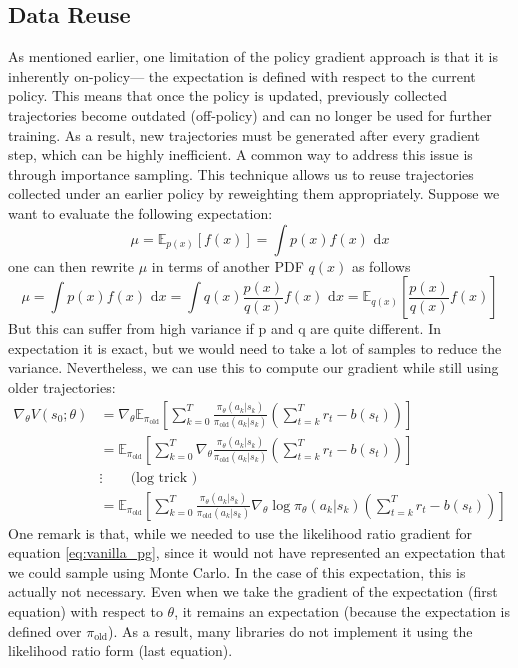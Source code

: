 \subsection{Data Reuse} \label{data_reuse}
As mentioned earlier, one limitation of the policy gradient approach is that it is inherently on-policy—
the expectation is defined with respect to the current policy. This means that once the policy is updated,
previously collected trajectories become outdated (off-policy) and can no longer be used for further training.
As a result, new trajectories must be generated after every gradient step, which can be highly inefficient.\newline
A common way to address this issue is through importance sampling. This technique allows us to reuse trajectories collected 
under an earlier policy by reweighting them appropriately. Suppose we want to evaluate the following expectation:
$$ \mu = \mathbb{E}_{p(x)}[f(x)] = \int p(x)f(x) \text{ d}x $$
one can then rewrite $\mu$ in terms of another PDF $q(x)$ as follows 
$$\mu = \int p(x)f(x) \text{ d}x = \int q(x)\frac{p(x)}{q(x)}f(x) \text{ d}x = 
\mathbb{E}_{q(x)}\left[\frac{p(x)}{q(x)}f(x)\right]$$ But this can suffer from high
variance if p and q are quite different. In expectation it is exact, but we 
would need to take a lot of samples to reduce the variance. Nevertheless, we can use 
this to compute our gradient while still using older trajectories:
\begin{align*}
\nabla_\theta V(s_0;\theta) &= \nabla_\theta \mathbb{E}_{\pi_{\text{old}}}\left[\sum_{k=0}^{T} \frac{\pi_{\theta}(a_k|s_k)}{\pi_{\text{old}}(a_k|s_k)} \left(\sum_{t=k}^{T}r_t - b(s_t)\right)\right]  \\
 &=  \mathbb{E}_{\pi_{\text{old}}}\left[\sum_{k=0}^{T}\nabla_\theta \frac{\pi_{\theta}(a_k|s_k)}{\pi_{\text{old}}(a_k|s_k)} \left(\sum_{t=k}^{T}r_t - b(s_t)\right)\right]  \\
 &\vdots \qquad\text{(log trick )}\\
&=\mathbb{E}_{\pi_{\text{old}}}\left[\sum_{k=0}^{T} \frac{\pi_{\theta}(a_k|s_k)}{\pi_{\text{old}}(a_k|s_k)} 
 \nabla_{\theta}\log{\pi_{\theta} (a_k|s_k) \left(\sum_{t=k}^{T}r_t - b(s_t)\right)}\right] 
\end{align*}
One remark is that, while we needed to use the likelihood ratio gradient for equation \eqref{eq:vanilla_pg}, since it would 
not have represented an expectation that we could sample using Monte Carlo. In the case of this expectation, this is actually 
not necessary. Even when we take the gradient of the expectation (first equation) with respect to $\theta$, it remains an 
expectation (because the expectation is defined over $\pi_{\text{old}}$). As a result, many libraries do not implement it 
using the likelihood ratio form (last equation).


